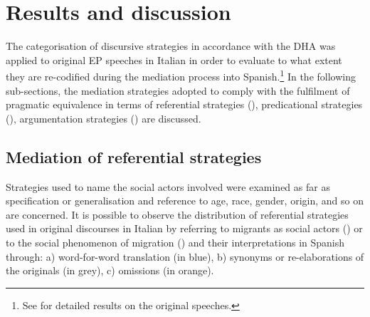 \documentclass[output=paper]{langscibook}
\begin{document}
\section{Results and discussion} \label{sec:mori:4}

The categorisation of discursive strategies in accordance with the DHA was applied to original EP speeches in Italian in order to evaluate to what extent they are re-codified during the mediation process into Spanish.\footnote{See \citet{Anghelli2019} for detailed results on the original speeches.} In the following sub-sections, the mediation strategies adopted to comply with the fulfilment of pragmatic equivalence in terms of referential strategies (), predicational strategies (), argumentation strategies () are discussed.


\subsection{Mediation of referential strategies} \label{sec:mori:4.1}

Strategies used to name the social actors involved were examined as far as specification or generalisation and reference to age, race, gender, origin, and so on are concerned. It is possible to observe the distribution of referential strategies used in original discourses in Italian by referring to migrants as social actors () or to the social phenomenon of migration () and their interpretations in Spanish through: a) word-for-word translation (in blue), b) synonyms or re-elaborations of the originals (in grey), c) omissions (in orange).
\end{document}
